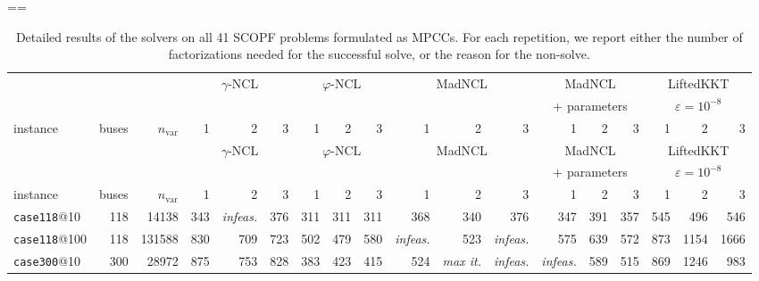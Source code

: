 \clearpage
\pdfpagewidth=\paperheight \pdfpageheight=\paperwidth
{}
{\footnotesize\setlength{\tabcolsep}{2.5pt}
\begin{longtable}{lrrrrrrrrrrrrrrrrr}
\caption{Detailed results of the solvers on all 41 SCOPF problems formulated as MPCCs. For each repetition, we report either the number of factorizations needed for the successful solve, or the reason for the non-solve.}\label{tab:scopf-appendix}\\
\toprule
 &  &  & \multicolumn{3}{c}{$\gamma$-NCL} & \multicolumn{3}{c}{$\varphi$-NCL} & \multicolumn{3}{c}{MadNCL} & \multicolumn{3}{c}{MadNCL} & \multicolumn{3}{c}{LiftedKKT} \\
 &  &  & \multicolumn{3}{c}{} & \multicolumn{3}{c}{} & \multicolumn{3}{c}{} & \multicolumn{3}{c}{+ parameters} & \multicolumn{3}{c}{$\varepsilon=10^{-8}$} \\
\cmidrule(lr){4-6} \cmidrule(lr){7-9} \cmidrule(lr){10-12} \cmidrule(lr){13-15} \cmidrule(lr){16-18}
instance & buses & $n_{\mathrm{var}}$ & 1 & 2 & 3 & 1 & 2 & 3 & 1 & 2 & 3 & 1 & 2 & 3 & 1 & 2 & 3 \\\midrule
\endfirsthead
\toprule
 &  &  & \multicolumn{3}{c}{$\gamma$-NCL} & \multicolumn{3}{c}{$\varphi$-NCL} & \multicolumn{3}{c}{MadNCL} & \multicolumn{3}{c}{MadNCL} & \multicolumn{3}{c}{LiftedKKT} \\
 &  &  & \multicolumn{3}{c}{} & \multicolumn{3}{c}{} & \multicolumn{3}{c}{} & \multicolumn{3}{c}{+ parameters} & \multicolumn{3}{c}{$\varepsilon=10^{-8}$} \\
\cmidrule(lr){4-6} \cmidrule(lr){7-9} \cmidrule(lr){10-12} \cmidrule(lr){13-15} \cmidrule(lr){16-18}
instance & buses & $n_{\mathrm{var}}$ & 1 & 2 & 3 & 1 & 2 & 3 & 1 & 2 & 3 & 1 & 2 & 3 & 1 & 2 & 3 \\\midrule
\endhead
\bottomrule
\endfoot
\texttt{case118}@10 & 118 & 14138 & 343 & \textit{infeas.} & 376 & 311 & 311 & 311 & 368 & 340 & 376 & 347 & 391 & 357 & 545 & 496 & 546 \\
\texttt{case118}@100 & 118 & 131588 & 830 & 709 & 723 & 502 & 479 & 580 & \textit{infeas.} & 523 & \textit{infeas.} & 575 & 639 & 572 & 873 & 1154 & 1666 \\
\texttt{case300}@10 & 300 & 28972 & 875 & 753 & 828 & 383 & 423 & 415 & 524 & \textit{max it.} & \textit{infeas.} & \textit{infeas.} & 589 & 515 & 869 & 1246 & 983 \\

\end{longtable}}
